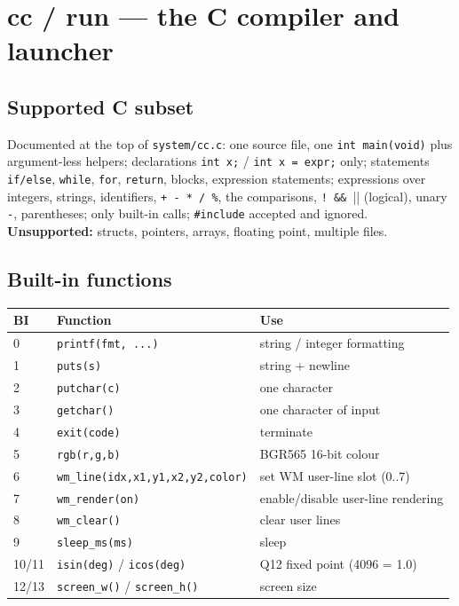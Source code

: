 \documentclass[a4paper,11pt]{article}
\begin{document}
\section{cc / run --- the C compiler and launcher}
\subsection{Supported C subset}
Documented at the top of \verb|system/cc.c|: one source file, one
\verb|int main(void)| plus argument-less helpers; declarations \verb|int x;| /
\verb|int x = expr;| only; statements \verb|if/else|, \verb|while|, \verb|for|,
\verb|return|, blocks, expression statements; expressions over integers,
strings, identifiers, \verb|+ - * / %|, the comparisons,
\verb|! && ||| (logical), unary \verb|-|, parentheses; only built-in calls;
\verb|#include| accepted and ignored. \textbf{Unsupported:} structs, pointers,
arrays, floating point, multiple files.

\subsection{Built-in functions}
\begin{center}\footnotesize
\begin{tabular}{@{}l l p{6.8cm}@{}}
\toprule \textbf{BI} & \textbf{Function} & \textbf{Use}\\ \midrule
0 & \verb|printf(fmt, ...)| & string / integer formatting\\
1 & \verb|puts(s)| & string + newline\\
2 & \verb|putchar(c)| & one character\\
3 & \verb|getchar()| & one character of input\\
4 & \verb|exit(code)| & terminate\\
5 & \verb|rgb(r,g,b)| & BGR565 16-bit colour\\
6 & \verb|wm_line(idx,x1,y1,x2,y2,color)| & set WM user-line slot (0..7)\\
7 & \verb|wm_render(on)| & enable/disable user-line rendering\\
8 & \verb|wm_clear()| & clear user lines\\
9 & \verb|sleep_ms(ms)| & sleep\\
10/11 & \verb|isin(deg)| / \verb|icos(deg)| & Q12 fixed point (4096 = 1.0)\\
12/13 & \verb|screen_w()| / \verb|screen_h()| & screen size\\
\bottomrule
\end{tabular}
\end{center}
\end{document}
